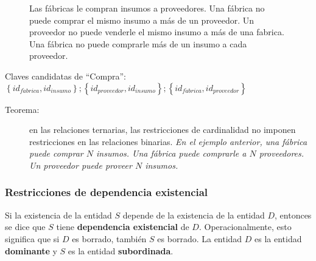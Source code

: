 \documentclass[a4paper, twoside]{article}
\begin{document}
\begin{description}
\begin{itemize}
\begin{figure}[H]
\protect\caption{Las fábricas le compran insumos a proveedores. Una fábrica no puede
comprar el mismo insumo a más de un proveedor. Un proveedor no puede
venderle el mismo insumo a más de una fabrica. Una fábrica no puede
comprarle más de un insumo a cada proveedor.}
\end{figure}



Claves candidatas de ``Compra'': $\left\{ id_{f\acute{a}brica},id_{insumo}\right\} ;\left\{ id_{proveedor},id_{insumo}\right\} ;\left\{ id_{f\acute{a}brica},id_{proveedor}\right\} $

\end{itemize}
\begin{description}
\item [{Teorema:}] en las relaciones ternarias, las restricciones de cardinalidad
no imponen restricciones en las relaciones binarias. \emph{En el ejemplo
anterior, una fábrica puede comprar $N$ insumos. Una fábrica puede
comprarle a $N$ proveedores. Un proveedor puede proveer $N$ insumos.}
\end{description}
\end{description}

\subsubsection{Restricciones de dependencia existencial}

Si la existencia de la entidad $S$ depende de la existencia de la
entidad $D$, entonces se dice que $S$ tiene \textbf{dependencia
existencial} de $D$. Operacionalmente, esto significa que si $D$
es borrado, también $S$ es borrado. La entidad $D$ es la entidad
\textbf{dominante} y $S$ es la entidad \textbf{subordinada}.
\end{document}
